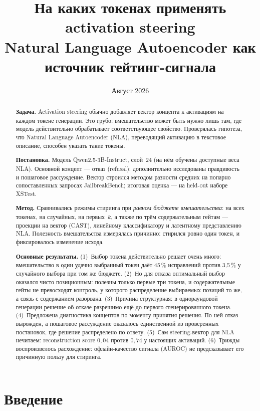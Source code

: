 \documentclass[11pt,a4paper]{article}
\title{\bfseries На каких токенах применять activation steering\\
\large Natural Language Autoencoder как источник гейтинг-сигнала}
\author{}
\date{Август 2026}
\begin{document}
\maketitle

\begin{abstract}
\noindent
\textbf{Задача.} Activation steering обычно добавляет вектор концепта к активациям
на каждом токене генерации. Это грубо: вмешательство может быть нужно лишь там,
где модель действительно обрабатывает соответствующее свойство. Проверялась
гипотеза, что Natural Language Autoencoder (NLA), переводящий активацию в
текстовое описание, способен указать такие токены.

\textbf{Постановка.} Модель Qwen2.5-3B-Instruct, слой~24 (на нём обучены
доступные веса NLA). Основной концепт --- отказ (refusal); дополнительно
исследованы правдивость и пошаговое рассуждение. Вектор строился методом
разности средних на попарно сопоставленных запросах JailbreakBench;
итоговая оценка --- на held-out наборе XSTest.

\textbf{Метод.} Сравнивались режимы стиринга при \emph{равном бюджете
вмешательства}: на всех токенах, на случайных, на первых~$k$, а также по трём
содержательным гейтам --- проекции на вектор (CAST), линейному классификатору и
латентному представлению NLA. Полезность вмешательства измерялась причинно:
стирился ровно один токен, и фиксировалось изменение исхода.

\textbf{Основные результаты.} (1)~Выбор токена действительно решает очень много:
вмешательство в один удачно выбранный токен даёт 45\,\% исправлений против
3{,}5\,\% у случайного выбора при том же бюджете. (2)~Но для отказа оптимальный
выбор оказался чисто позиционным: полезны только первые три токена, и
содержательные гейты не превосходят контроль, у которого распределение
выбираемых позиций то же, а связь с содержанием разорвана. (3)~Причина
структурная: в однораундовой генерации решение об отказе разрешимо ещё до
первого сгенерированного токена. (4)~Предложена диагностика концептов по моменту
принятия решения. По ней отказ вырожден, а пошаговое рассуждение оказалось
единственной из проверенных постановок, где решение распределено по ответу.
(5)~Сам steering-вектор для NLA нечитаем: reconstruction score $0{,}04$ против
$0{,}74$ у настоящих активаций. (6)~Трижды воспроизвелось расхождение:
офлайн-качество сигнала (AUROC) не предсказывает его причинную пользу для
стиринга.
\end{abstract}

\section{Введение}
\end{document}
